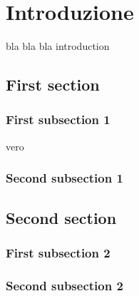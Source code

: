 \chapter{Introduzione}
bla bla bla introduction
\section{First section}
\subsection{First subsection 1} 
\e vero
\subsection{Second subsection 1}
\section{Second section}
\subsection{First subsection 2} 
\subsection{Second subsection 2}
